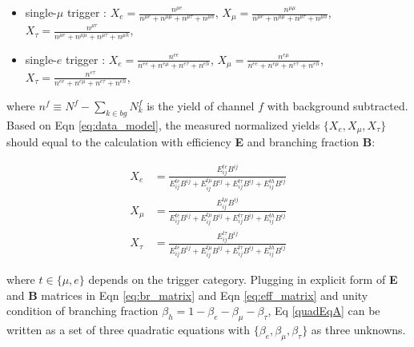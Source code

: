 \begin{itemize}
    \item single-\(\mu\) trigger : 
    \(X_{e} = \frac{n^{\mu e}}{n^{\mu e} + n^{\mu \mu} + n^{\mu \tau} + n^{\mu h}}\), 
    \(X_{\mu} = \frac{n^{\mu \mu}}{n^{\mu e} + n^{\mu \mu} + n^{\mu \tau} + n^{\mu h}}\), 
    \(X_{\tau} = \frac{n^{\mu \tau}}{n^{\mu e} + n^{\mu \mu} + n^{\mu \tau} + n^{\mu h}}\),

    \item single-\(e\) trigger : 
    \(X_{e} = \frac{n^{e e}}{n^{e e} + n^{e \mu} + n^{e \tau} + n^{e h}}\), 
    \(X_{\mu} = \frac{n^{e \mu}}{n^{e e} + n^{e \mu} + n^{e \tau} + n^{e h}}\), 
    \(X_{\tau} = \frac{n^{e \tau}}{n^{e e} + n^{e \mu} + n^{e \tau} + n^{e h}}\),
\end{itemize}

where \(n^f \equiv N^f - \sum_{k\in bg} N^f_k \) is the yield of channel
\(f\) with background subtracted. Based on Eqn \ref{eq:data_model}, the measured normalized yields
\(\{X_{e},X_{\mu},X_{\tau}\}\) should equal to the calculation with
efficiency \textbf{E} and branching fraction \textbf{B}:

\begin{equation} \label{quadEqA}
    \begin{split}
    X_e &= \frac{ E_{ij}^{te}B^{ij} }{E_{ij}^{te}B^{ij} + E_{ij}^{t\mu}B^{ij} + E_{ij}^{t\tau}B^{ij} + E_{ij}^{th}B^{ij}} \\
    X_\mu &= \frac{ E_{ij}^{t\mu}B^{ij} }{E_{ij}^{te}B^{ij} + E_{ij}^{t\mu}B^{ij} + E_{ij}^{t\tau}B^{ij} + E_{ij}^{th}B^{ij}} \\
    X_\tau &= \frac{ E_{ij}^{t\tau}B^{ij} }{E_{ij}^{te}B^{ij} + E_{ij}^{t\mu}B^{ij} + E_{ij}^{t\tau}B^{ij} + E_{ij}^{th}B^{ij}}
    \end{split}
\end{equation}








where \(t\in \{\mu,e\}\) depends on the trigger category. Plugging in
explicit form of \textbf{E} and \textbf{B} matrices in Eqn \ref{eq:br_matrix} and Eqn \ref{eq:eff_matrix}
and unity condition of branching fraction \(\beta_h = 1- \beta_e -
\beta_\mu - \beta_\tau\), Eq \ref{quadEqA} can be written as a set of
three quadratic equations with
\(\{\beta_{e},\beta_{\mu},\beta_{\tau}\}\) as three unknowns.


